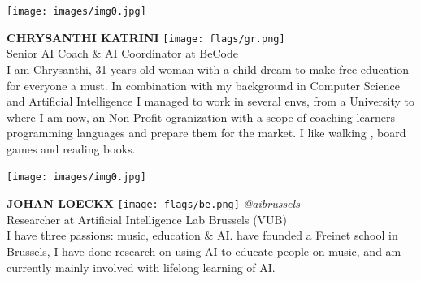 \documentclass[11pt]{article}
\begin{document}
\noindent
\begin{minipage}{0.3\textwidth}
\centering
\texttt{[image: images/img0.jpg]}
\end{minipage}
\hfill
\begin{minipage}{0.6\textwidth}\raggedright
\color{color1}\uppercase{\textbf{Chrysanthi Katrini}}
\color{color2}\hspace{0.2cm}\texttt{[image: flags/gr.png]}
\\
Senior AI Coach \& AI Coordinator at BeCode\\
{\footnotesize I am Chrysanthi, 31 years old woman with a child dream to make free education for everyone a must. In combination with my background in Computer Science and Artificial Intelligence I managed to work in several envs, from a University to where I am now, an Non Profit ogranization with a scope of coaching learners programming languages and prepare them for the market. I like walking , board games and reading books. }\\
\end{minipage}
\newline\newline\newline

\noindent
\begin{minipage}{0.3\textwidth}
\centering
\texttt{[image: images/img0.jpg]}
\end{minipage}
\hfill
\begin{minipage}{0.6\textwidth}\raggedright
\color{color1}\uppercase{\textbf{Johan Loeckx}}
\color{color2}\hspace{0.2cm}\texttt{[image: flags/be.png]}
\hspace{0.2cm}\textit{@aibrussels}
\\
Researcher at Artificial Intelligence Lab Brussels (VUB)\\
{\footnotesize I have three passions: music, education \& AI.  have founded a Freinet school in Brussels, I have done research on using AI to educate people on music, and am currently mainly involved with lifelong learning of AI.}\\
\end{minipage}
\newline\newline\newline
\end{document}
